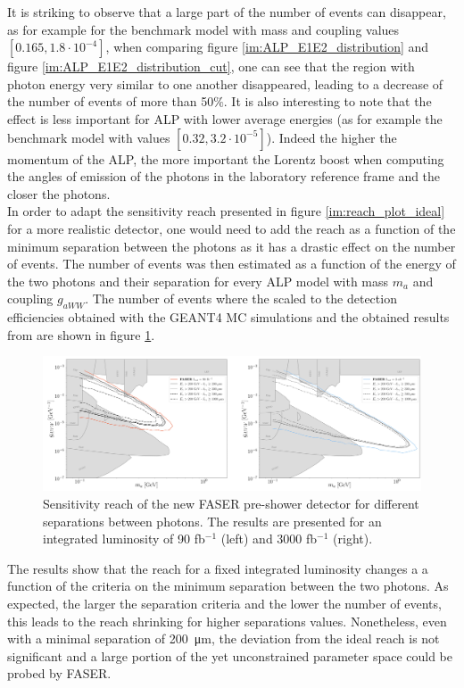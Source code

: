 		It is striking to observe that a large part of the number of events can disappear, as for example for the benchmark model with mass and coupling values $\left[0.165, 1.8\cdot 10^{-4}\right]$, when comparing figure \ref{im:ALP_E1E2_distribution} and figure \ref{im:ALP_E1E2_distribution_cut}, one can see that the region with photon energy very similar to one another disappeared, leading to a decrease of the number of events of more than 50$\%$. It is also interesting to note that the effect is less important for ALP with lower average energies (as for example the benchmark model with values $\left[0.32, 3.2\cdot 10^{-5}\right]$). Indeed the higher the momentum of the ALP, the more important the Lorentz boost when computing the angles of emission of the photons in the laboratory reference frame and the closer the photons. \\
		
		In order to adapt the sensitivity reach presented in figure \ref{im:reach_plot_ideal} for a more realistic detector, one would need to add the reach as a function of the minimum separation between the photons as it has a drastic effect on the number of events. The number of events was then estimated as a function of the energy of the two photons and their separation for every ALP model with mass $m_a$ and coupling $g_{aWW}$. The number of events where the scaled to the detection efficiencies obtained with the GEANT4 MC simulations and the obtained results from \cite{Moretti_MasterThesis} are shown in figure \ref{im:reach_plot_detector}.
		\begin{figure}[h]
			\centering
			\includegraphics[width=1.0\linewidth]{files/reach_plot_detector}
			\caption{Sensitivity reach of the new FASER pre-shower detector for different separations between photons. The results are presented for an integrated luminosity of 90 fb$^{-1}$ (left) and 3000 fb$^{-1}$ (right).}
			\label{im:reach_plot_detector}
		\end{figure}
		The results show that the reach for a fixed integrated luminosity changes a a function of the criteria on the minimum separation between the two photons. As expected, the larger the separation criteria and the lower the number of events, this leads to the reach shrinking for higher separations values. Nonetheless, even with a minimal separation of \SI{200}{\micro\meter}, the deviation from the ideal reach is not significant and a large portion of the yet unconstrained parameter space could be probed by FASER. 
		
